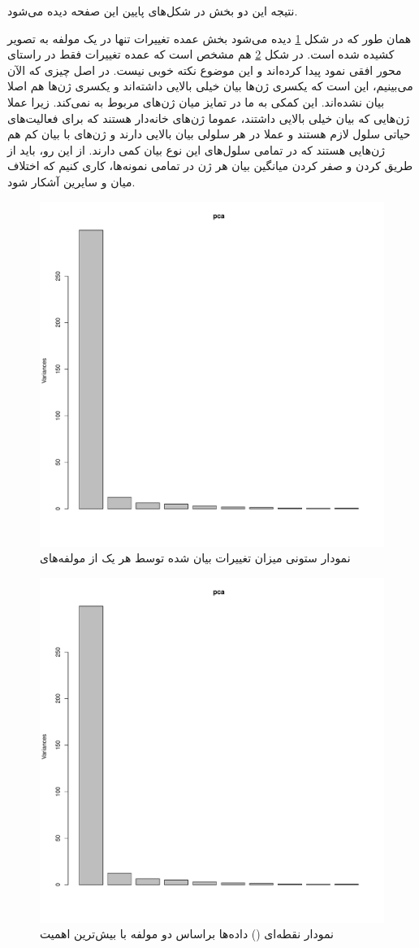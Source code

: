 \documentclass[12pt]{article}
\begin{document}
نتیجه این دو بخش در شکل‌های پایین این صفحه دیده می‌شود.



همان طور که در شکل \ref{fig:pcahist} دیده می‌شود بخش عمده تغییرات تنها در یک مولفه به تصویر کشیده شده است. در شکل \ref{fig:pcadot} هم مشخص است که عمده تغییرات فقط در راستای محور افقی نمود پیدا کرده‌اند و این موضوع نکته خوبی نیست. در اصل چیزی که الآن می‌بینیم، این است که یکسری ژن‌ها بیان خیلی بالایی داشته‌اند و یکسری ژن‌ها هم اصلا بیان نشده‌اند. این کمکی به ما در تمایز میان ژن‌های مربوط به  نمی‌کند. زیرا عملا ژن‌هایی که بیان خیلی بالایی داشتند، عموما ژن‌های خانه‌دار
هستند که برای فعالیت‌های حیاتی سلول لازم هستند و عملا در هر سلولی بیان بالایی دارند و ژن‌های با بیان کم هم ژن‌هایی هستند که در تمامی سلول‌های این نوع بیان کمی دارند. از این رو، باید از طریق  کردن و صفر کردن میانگین بیان هر ژن در تمامی نمونه‌ها، کاری کنیم که اختلاف میان  و سایرین آشکار شود.



\begin{figure}[h!]
\centering	
	\includegraphics[width = 0.5 \textwidth , page=1]{./Results/pca.pdf}
	\caption{نمودار ستونی میزان تغییرات بیان شده توسط هر یک از مولفه‌های }
	\label{fig:pcahist}
\end{figure}

\begin{figure}[h!]
\centering	
	\includegraphics[width = 0.5 \textwidth , page =2]{./Results/pca.pdf}
	\caption{نمودار نقطه‌ای () داده‌ها براساس دو مولفه با بیش‌ترین اهمیت}
	\label{fig:pcadot}
\end{figure}
	\newpage
\end{document}
